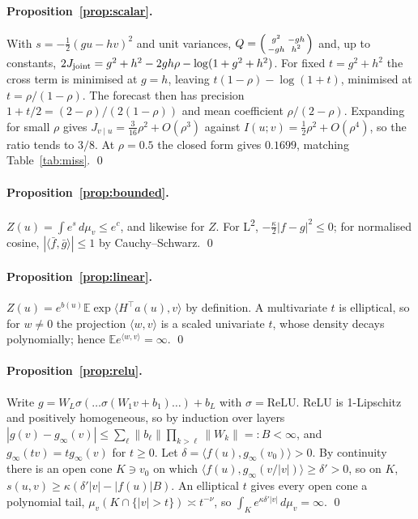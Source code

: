 \documentclass[11pt]{article}
\newcommand{\Ltwo}{L\textsuperscript{2}}
\newcommand{\E}{\mathbb{E}}
\newcommand{\vu}{{v\mid u}}
\theoremstyle{plain}
\theoremstyle{definition}
\theoremstyle{remark}
\begin{document}
\paragraph{Proposition~\ref{prop:scalar}.} With $s=-\frac12(gu-hv)^2$ and unit variances,
$Q=\begin{psmallmatrix}g^2&-gh\\-gh&h^2\end{psmallmatrix}$ and, up to constants,
$2J_{\rm joint}=g^2+h^2-2gh\rho-\log(1+g^2+h^2)$. For fixed $t=g^2+h^2$ the cross term is minimised
at $g=h$, leaving $t(1-\rho)-\log(1+t)$, minimised at $t=\rho/(1-\rho)$. The forecast then has
precision $1+t/2=(2-\rho)/(2(1-\rho))$ and mean coefficient $\rho/(2-\rho)$. Expanding for small $\rho$
gives $J_\vu=\frac3{16}\rho^2+O(\rho^3)$ against $I(u;v)=\frac12\rho^2+O(\rho^4)$, so the ratio tends to
$3/8$. At $\rho=0.5$ the closed form gives $0.1699$, matching Table~\ref{tab:miss}. \qed

\paragraph{Proposition~\ref{prop:bounded}.} $Z(u)=\int e^{s}\,d\mu_v\le e^c$, and likewise for $Z$. For
\Ltwo{}, $-\frac\kappa2|f-g|^2\le0$; for normalised cosine, $|\langle\bar f,\bar g\rangle|\le1$ by
Cauchy--Schwarz. \qed

\paragraph{Proposition~\ref{prop:linear}.} $Z(u)=e^{b(u)}\E\exp\langle H^\top a(u),v\rangle$ by definition. A
multivariate $t$ is elliptical, so for $w\ne0$ the projection $\langle w,v\rangle$ is a scaled
univariate $t$, whose density decays polynomially; hence $\E e^{\langle w,v\rangle}=\infty$. \qed

\paragraph{Proposition~\ref{prop:relu}.} Write $g=W_L\sigma(\dots\sigma(W_1v+b_1)\dots)+b_L$ with
$\sigma=\mathrm{ReLU}$. ReLU is 1-Lipschitz and positively homogeneous, so by induction over layers
$|g(v)-g_\infty(v)|\le\sum_\ell\|b_\ell\|\prod_{k>\ell}\|W_k\|=:B<\infty$, and $g_\infty(tv)=tg_\infty(v)$ for $t\ge0$.
Let $\delta=\langle f(u),g_\infty(v_0)\rangle>0$. By continuity there is an open cone $K\ni v_0$ on which
$\langle f(u),g_\infty(v/|v|)\rangle\ge\delta'>0$, so on $K$, $s(u,v)\ge\kappa(\delta'|v|-|f(u)|B)$. An elliptical
$t$ gives every open cone a polynomial tail, $\mu_v(K\cap\{|v|>t\})\asymp t^{-\nu}$, so
$\int_K e^{\kappa\delta'|v|}\,d\mu_v=\infty$. \qed
\end{document}
